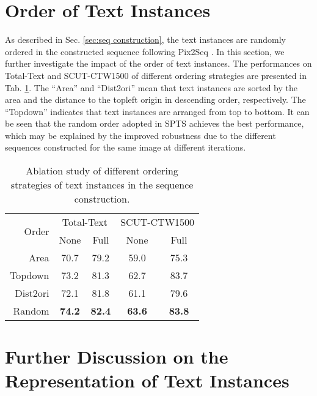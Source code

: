 \documentclass[sigconf]{acmart}
\begin{document}
\section{Order of Text Instances}

As described in Sec. \ref{sec:seq construction}, the text instances are randomly ordered in the constructed sequence following Pix2Seq \cite{chen2021pix2seq}. In this section, we further investigate the impact of the order of text instances. The performances on Total-Text and SCUT-CTW1500 of different ordering strategies are presented in Tab. \ref{tab_ordering}. The ``Area'' and ``Dist2ori'' mean that text instances are sorted by the area and the distance to the topleft origin in descending order, respectively. The ``Topdown'' indicates that text instances are arranged from top to bottom. It can be seen that the random order adopted in SPTS achieves the best performance, which may be explained by the improved robustness due to the different sequences constructed for the same image at different iterations.

\begin{table}[b!]
    \centering
    \caption{Ablation study of different ordering strategies of text instances in the sequence construction.}
    \label{tab_ordering}
    \small
    \begin{tabular}{r|cc|cc}
        \hline
        \multirow{2}{*}{Order} & \multicolumn{2}{c|}{Total-Text} & \multicolumn{2}{c}{SCUT-CTW1500} \\
        \cline{2-5}
         & None & Full & None & Full \\
        \hline
        Area & 70.7 & 79.2 & 59.0 & 75.3 \\
        Topdown & 73.2 & 81.3 & 62.7 & 83.7 \\
        Dist2ori & 72.1 & 81.8 & 61.1 & 79.6 \\
        \hline 
        Random & \textbf{74.2} & \textbf{82.4} & \textbf{63.6} & \textbf{83.8}  \\
        \hline
    \end{tabular}
\end{table}

\section{Further Discussion on the Representation of Text Instances}
\end{document}
